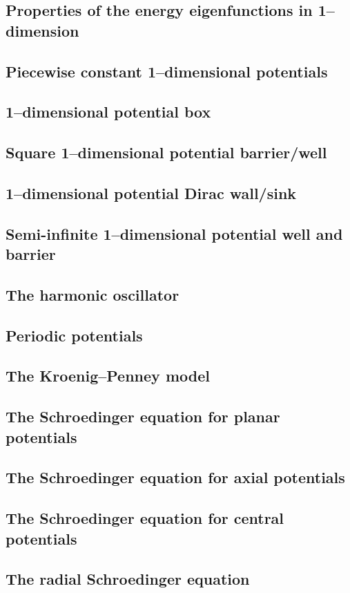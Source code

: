 \documentclass{article}
\begin{document}
\subsection{Properties of the energy eigenfunctions in 1–dimension}
\subsection{Piecewise constant 1–dimensional potentials}
\subsection{1–dimensional potential box}
\subsection{Square 1–dimensional potential barrier/well}
\subsection{1–dimensional potential Dirac wall/sink}
\subsection{Semi-infinite 1–dimensional potential well and barrier}
\subsection{The harmonic oscillator}
\subsection{Periodic potentials}
\subsection{The Kroenig–Penney model}
\subsection{The Schroedinger equation for planar potentials}
\subsection{The Schroedinger equation for axial potentials}
\subsection{The Schroedinger equation for central potentials}
\subsection{The radial Schroedinger equation}
\end{document}
